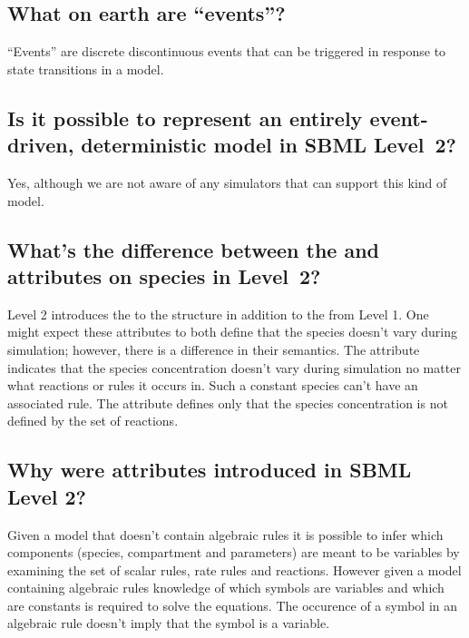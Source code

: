 \documentclass{sbmlfaq}
\begin{document}
\subsection{What on earth are ``events''?}

``Events'' are discrete discontinuous events that can be triggered in
response to state transitions in a model.


\subsection{Is it possible to represent an entirely
  event-driven, deterministic model in SBML Level~2?} 

Yes, although we are not aware of any simulators that can support this kind
of model.


\subsection{What's the difference between the \textup{}
  and \textup{} attributes on species in Level~2?}

Level 2 introduces the  to the  structure
in addition to the  from Level 1.  One might
expect these attributes to both define that the species doesn't vary during
simulation; however, there is a difference in their semantics.  The
 attribute indicates that the species concentration
doesn't vary during simulation no matter what reactions or rules it occurs
in.  Such a constant species can't have an associated rule.  The
 attribute defines only that the species
concentration is not defined by the set of reactions.


\subsection{Why were  attributes introduced in SBML Level 2?}

Given a model that doesn't contain algebraic rules it is possible to infer 
which components (species, compartment and parameters) are meant to be variables
by examining the set of scalar rules, rate rules and reactions.
However given a model
containing algebraic rules knowledge of which symbols are
variables and which are constants is required to solve the equations.
The occurence of a symbol in an algebraic rule doesn't imply that
the symbol is a variable.   
\end{document}
